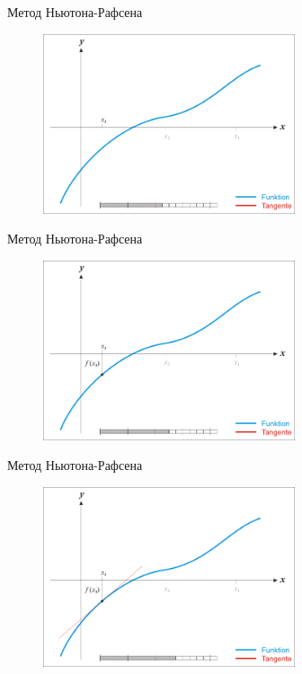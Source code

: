 \documentclass[10pt]{beamer}
\begin{document}
\begin{frame}{Метод Ньютона-Рафсена}
	\begin{figure}[htbp]
	  \includegraphics[height=150pt, keepaspectratio = true]{images/newton-9}   
	\end{figure}
\end{frame}

\begin{frame}{Метод Ньютона-Рафсена}
	\begin{figure}[htbp]
	  \includegraphics[height=150pt, keepaspectratio = true]{images/newton-10}   
	\end{figure}
\end{frame}

\begin{frame}{Метод Ньютона-Рафсена}
	\begin{figure}[htbp]
	  \includegraphics[height=150pt, keepaspectratio = true]{images/newton-11}   
	\end{figure}
\end{frame}
\end{document}
